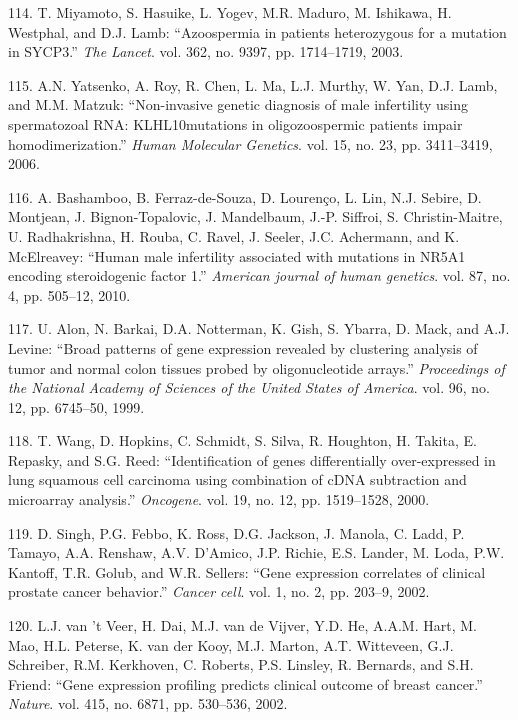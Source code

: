 \documentclass[12pt,a4paper,twoside]{ugathesis}
\theoremstyle{definition}
\theoremstyle{definition}
\theoremstyle{definition}
\theoremstyle{remark}
\begin{document}
\hypertarget{ref-Miyamoto2003}{}
114. T. Miyamoto, S. Hasuike, L. Yogev, M.R. Maduro, M. Ishikawa, H.
Westphal, and D.J. Lamb: ``Azoospermia in patients heterozygous for a
mutation in SYCP3.'' \emph{The Lancet}. vol. 362, no. 9397, pp.
1714--1719, 2003.

\hypertarget{ref-Yatsenko2006}{}
115. A.N. Yatsenko, A. Roy, R. Chen, L. Ma, L.J. Murthy, W. Yan, D.J.
Lamb, and M.M. Matzuk: ``Non-invasive genetic diagnosis of male
infertility using spermatozoal RNA: KLHL10mutations in oligozoospermic
patients impair homodimerization.'' \emph{Human Molecular Genetics}.
vol. 15, no. 23, pp. 3411--3419, 2006.

\hypertarget{ref-Bashamboo2010}{}
116. A. Bashamboo, B. Ferraz-de-Souza, D. Lourenço, L. Lin, N.J. Sebire,
D. Montjean, J. Bignon-Topalovic, J. Mandelbaum, J.-P. Siffroi, S.
Christin-Maitre, U. Radhakrishna, H. Rouba, C. Ravel, J. Seeler, J.C.
Achermann, and K. McElreavey: ``Human male infertility associated with
mutations in NR5A1 encoding steroidogenic factor 1.'' \emph{American
journal of human genetics}. vol. 87, no. 4, pp. 505--12, 2010.

\hypertarget{ref-Alon1999}{}
117. U. Alon, N. Barkai, D.A. Notterman, K. Gish, S. Ybarra, D. Mack,
and A.J. Levine: ``Broad patterns of gene expression revealed by
clustering analysis of tumor and normal colon tissues probed by
oligonucleotide arrays.'' \emph{Proceedings of the National Academy of
Sciences of the United States of America}. vol. 96, no. 12, pp.
6745--50, 1999.

\hypertarget{ref-Wang2000}{}
118. T. Wang, D. Hopkins, C. Schmidt, S. Silva, R. Houghton, H. Takita,
E. Repasky, and S.G. Reed: ``Identification of genes differentially
over-expressed in lung squamous cell carcinoma using combination of cDNA
subtraction and microarray analysis.'' \emph{Oncogene}. vol. 19, no. 12,
pp. 1519--1528, 2000.

\hypertarget{ref-Singh2002}{}
119. D. Singh, P.G. Febbo, K. Ross, D.G. Jackson, J. Manola, C. Ladd, P.
Tamayo, A.A. Renshaw, A.V. D'Amico, J.P. Richie, E.S. Lander, M. Loda,
P.W. Kantoff, T.R. Golub, and W.R. Sellers: ``Gene expression correlates
of clinical prostate cancer behavior.'' \emph{Cancer cell}. vol. 1, no.
2, pp. 203--9, 2002.

\hypertarget{ref-VantVeer2002}{}
120. L.J. van 't Veer, H. Dai, M.J. van de Vijver, Y.D. He, A.A.M. Hart,
M. Mao, H.L. Peterse, K. van der Kooy, M.J. Marton, A.T. Witteveen, G.J.
Schreiber, R.M. Kerkhoven, C. Roberts, P.S. Linsley, R. Bernards, and
S.H. Friend: ``Gene expression profiling predicts clinical outcome of
breast cancer.'' \emph{Nature}. vol. 415, no. 6871, pp. 530--536, 2002.
\end{document}
